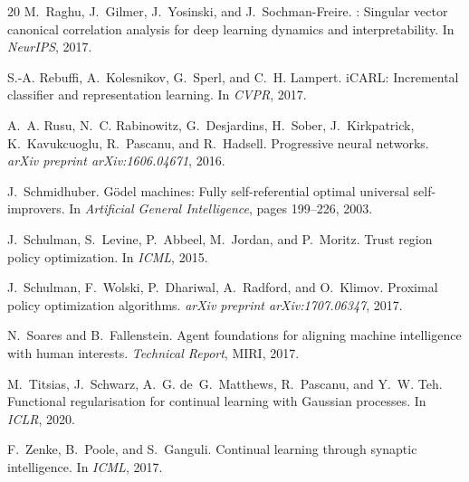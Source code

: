 \documentclass{article}
\begin{document}
\begin{thebibliography}{20}
M.~Raghu, J.~Gilmer, J.~Yosinski, and J.~Sochman-Freire.
: Singular vector canonical correlation analysis for deep learning dynamics and interpretability.
\newblock In \emph{NeurIPS}, 2017.

S.-A. Rebuffi, A.~Kolesnikov, G.~Sperl, and C.~H. Lampert.
\newblock i{CARL}: Incremental classifier and representation learning.
\newblock In \emph{CVPR}, 2017.

A.~A. Rusu, N.~C. Rabinowitz, G.~Desjardins, H.~Sober, J.~Kirkpatrick, K.~Kavukcuoglu, R.~Pascanu, and R.~Hadsell.
\newblock Progressive neural networks.
\newblock \emph{arXiv preprint arXiv:1606.04671}, 2016.

J.~Schmidhuber.
\newblock G{\"o}del machines: Fully self-referential optimal universal self-improvers.
\newblock In \emph{Artificial General Intelligence}, pages 199--226, 2003.

J.~Schulman, S.~Levine, P.~Abbeel, M.~Jordan, and P.~Moritz.
\newblock Trust region policy optimization.
\newblock In \emph{ICML}, 2015.

J.~Schulman, F.~Wolski, P.~Dhariwal, A.~Radford, and O.~Klimov.
\newblock Proximal policy optimization algorithms.
\newblock \emph{arXiv preprint arXiv:1707.06347}, 2017.

N.~Soares and B.~Fallenstein.
\newblock Agent foundations for aligning machine intelligence with human interests.
\newblock \emph{Technical Report}, MIRI, 2017.

M.~Titsias, J.~Schwarz, A.~G. de~G.~Matthews, R.~Pascanu, and Y.~W. Teh.
\newblock Functional regularisation for continual learning with {G}aussian processes.
\newblock In \emph{ICLR}, 2020.

F.~Zenke, B.~Poole, and S.~Ganguli.
\newblock Continual learning through synaptic intelligence.
\newblock In \emph{ICML}, 2017.

\end{thebibliography}

\appendix
\end{document}
